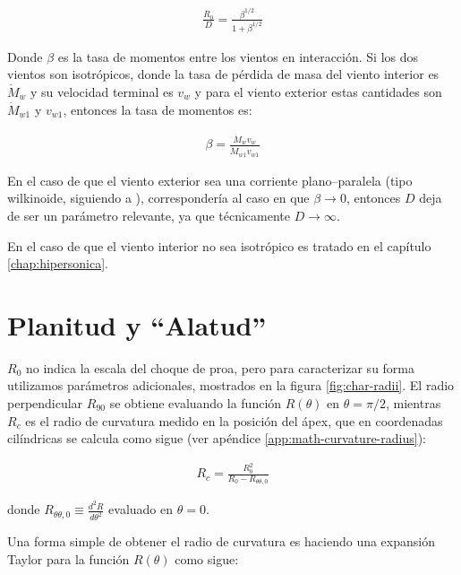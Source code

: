 \begin{align}
  \frac{R_0}{D} = \frac{\beta^{1/2}}{1 + \beta^{1/2}}
\end{align}

Donde $\beta$ es la tasa de momentos entre los vientos en interacción. Si los dos vientos son isotrópicos, donde la tasa de pérdida de masa del viento interior es $\dot{M}_w$ y su velocidad terminal es $v_w$ y para el viento exterior estas cantidades son $\dot{M}_{w1}$ y $v_{w1}$, entonces la tasa de momentos es:

\begin{align}
  \beta = \frac{\dot{M}_w v_w}{\dot{M}_{w1} v_{w1}} \label{eq:beta-def}
\end{align}

En el caso de que el viento exterior sea una corriente plano--paralela (tipo wilkinoide, siguiendo a \citet{Wilkin:1996}), correspondería al caso en que $\beta\to 0$, entonces $D$ deja de ser un parámetro relevante, ya que técnicamente $D\to\infty$.

En el caso de que el viento interior no sea isotrópico es tratado en el capítulo \ref{chap:hipersonica}.

\section{Planitud y ``Alatud''}
\label{sec:char-rad}

$R_0$ no indica la escala del choque de proa, pero para caracterizar su forma utilizamos parámetros adicionales, mostrados en la figura \ref{fig:char-radii}. El radio perpendicular $R_{90}$ se obtiene evaluando la función $R(\theta)$ en $\theta=\pi/2$, mientras $R_c$ es el radio de curvatura medido en la posición del ápex, que en coordenadas cilíndricas se calcula como sigue (ver apéndice \ref{app:math-curvature-radius}):

\begin{align}
  R_c = \frac{R^2_0}{R_0 - R_{\theta\theta, 0}} \label{eq:generic-Rc}
\end{align}

donde $R_{\theta\theta, 0}\equiv \frac{d^2R}{d\theta^2}$ evaluado en $\theta = 0$.

Una forma simple de obtener el radio de curvatura es haciendo una expansión Taylor para la función $R(\theta)$ como sigue:

